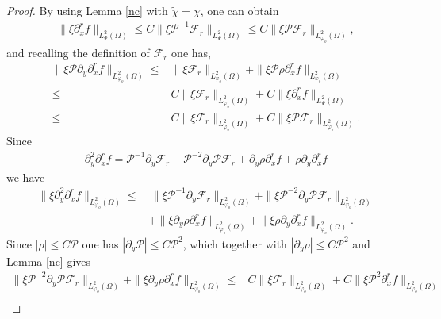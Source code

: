 \documentclass{amsart}
\numberwithin{equation}{section}
\begin{document}
\begin{proof}
By using Lemma \ref{nc} with $\tilde{\chi}=\chi$, one can obtain
\begin{align*}
\|\xi\partial_{x}^{r}f\|_{L_{\Psi}^{2}(\Omega)}
\leq C\|\xi\mathcal{P}^{-1}\mathcal{F}_{r}\|_{L_{\Psi}^{2}(\Omega)}
\leq C\|\xi\mathcal{P}\mathcal{F}_{r}\|_{L_{\varphi_{o}}^{2}(\Omega)},
\end{align*}
and recalling the definition of $\mathcal{F}_{r}$ one has,
\begin{align*}
\|\xi\mathcal{P}\partial_{y}\partial_{x}^{r}f\|_{L_{\varphi_{o}}^{2}(\Omega)}
\leq& \|\xi\mathcal{F}_{r}\|_{L_{\varphi_{o}}^{2}(\Omega)}
     +\|\xi\mathcal{P}\rho\partial_{x}^{r}f\|_{L_{\varphi_{o}}^{2}(\Omega)}\\
\leq& C\|\xi\mathcal{F}_{r}\|_{L_{\varphi_{o}}^{2}(\Omega)}
     +C\|\xi\partial_{x}^{r}f\|_{L_{\Psi}^{2}(\Omega)}\nonumber\\
\leq& C\|\xi\mathcal{F}_{r}\|_{L_{\varphi_{o}}^{2}(\Omega)}
     +C\|\xi\mathcal{P}\mathcal{F}_{r}\|_{L_{\varphi_{o}}^{2}(\Omega)}.
\end{align*}
Since
\begin{align*}
\partial_{y}^{2}\partial_{x}^{r}f
= \mathcal{P}^{-1}\partial_{y}\mathcal{F}_{r}
 -\mathcal{P}^{-2}\partial_{y}\mathcal{P}\mathcal{F}_{r}
 +\partial_{y}\rho\partial_{x}^{r}f
 +\rho\partial_{y}\partial_{x}^{r}f
\end{align*}
we have
\begin{align}\label{ncC2-1}
\|\xi\partial_{y}^{2}\partial_{x}^{r}f\|_{L_{\varphi_{o}}^{2}(\Omega)}
\leq&~\|\xi\mathcal{P}^{-1}\partial_{y}\mathcal{F}_{r}\|_{L_{\varphi_{o}}^{2}(\Omega)}
     +\|\xi\mathcal{P}^{-2}\partial_{y}\mathcal{P}\mathcal{F}_{r}\|_{L_{\varphi_{o}}^{2}(\Omega)}\\
    &+\|\xi\partial_{y}\rho\partial_{x}^{r}f\|_{L_{\varphi_{o}}^{2}(\Omega)}
     +\|\xi\rho\partial_{y}\partial_{x}^{r}f\|_{L_{\varphi_{o}}^{2}(\Omega)}.\nonumber
\end{align}
Since $|\rho|\leq C\mathcal{P}$ one has $|\partial_{y}\mathcal{P}|\leq C\mathcal{P}^{2}$, which together with $|\partial_{y}\rho|\leq C\mathcal{P}^{2}$ and Lemma \ref{nc} gives
\begin{align}\label{ncC2-11}
\|\xi\mathcal{P}^{-2}\partial_{y}\mathcal{P}\mathcal{F}_{r}\|_{L_{\varphi_{o}}^{2}(\Omega)}
+\|\xi\partial_{y}\rho\partial_{x}^{r}f\|_{L_{\varphi_{o}}^{2}(\Omega)}
\leq& C\|\xi\mathcal{F}_{r}\|_{L_{\varphi_{o}}^{2}(\Omega)}
     +C\|\xi\mathcal{P}^{2}\partial_{x}^{r}f\|_{L_{\varphi_{o}}^{2}(\Omega)}\\

\end{align}
\end{proof}
\end{document}
